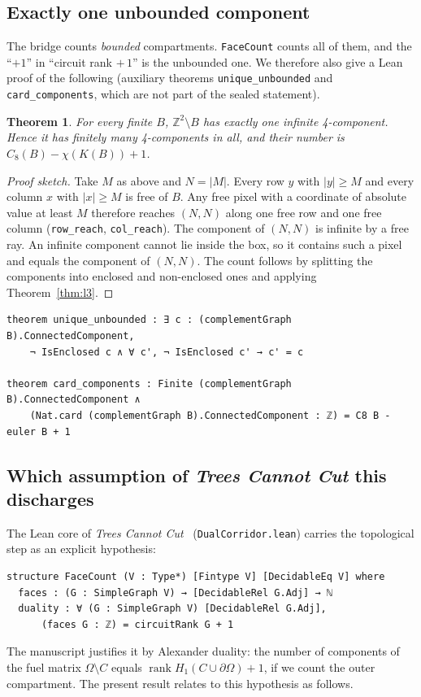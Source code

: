 \documentclass[11pt]{article}
\newtheorem{theorem}{Theorem}
\theoremstyle{definition}
\theoremstyle{remark}
\begin{document}
\subsection{Exactly one unbounded component}

The bridge counts \emph{bounded} compartments. \texttt{FaceCount} counts all of them,
and the ``$+1$'' in ``circuit rank $+\,1$'' is the unbounded one. We therefore also give a Lean
proof of the following (auxiliary theorems \texttt{unique\_unbounded} and
\texttt{card\_components}, which are not part of the sealed statement).

\begin{theorem}\label{thm:total}
For every finite $B$, $\mathbb{Z}^2\setminus B$ has exactly one infinite 4-component.
Hence it has finitely many 4-components in all, and their number is
$C_8(B)-\chi(K(B))+1$.
\end{theorem}

\begin{proof}[Proof sketch]
Take $M$ as above and $N=|M|$. Every row $y$ with $|y|\ge M$ and every column $x$ with
$|x|\ge M$ is free of $B$. Any free pixel with a coordinate of absolute value
at least $M$ therefore reaches $(N,N)$ along one free row and one free column
(\texttt{row\_reach}, \texttt{col\_reach}). The component of $(N,N)$ is infinite by a free ray.
An infinite component cannot lie inside the box, so it contains such a pixel and equals
the component of $(N,N)$. The count follows by splitting the components into enclosed and
non-enclosed ones and applying Theorem~\ref{thm:l3}.
\end{proof}

\begin{lstlisting}[caption={The total compartment count (excerpt from \texttt{proofs/P1.Bridge.lean}).}]
theorem unique_unbounded : ∃ c : (complementGraph B).ConnectedComponent,
    ¬ IsEnclosed c ∧ ∀ c', ¬ IsEnclosed c' → c' = c

theorem card_components : Finite (complementGraph B).ConnectedComponent ∧
    (Nat.card (complementGraph B).ConnectedComponent : ℤ) = C8 B - euler B + 1
\end{lstlisting}

\subsection{Which assumption of \emph{Trees Cannot Cut} this discharges}

The Lean core of \emph{Trees Cannot Cut}~\cite{Hart2026} (\texttt{DualCorridor.lean}) carries
the topological step as an explicit hypothesis:
\begin{lstlisting}
structure FaceCount (V : Type*) [Fintype V] [DecidableEq V] where
  faces : (G : SimpleGraph V) → [DecidableRel G.Adj] → ℕ
  duality : ∀ (G : SimpleGraph V) [DecidableRel G.Adj],
      (faces G : ℤ) = circuitRank G + 1
\end{lstlisting}
The manuscript justifies it by Alexander duality: the number of components of the fuel
matrix $\Omega\setminus C$ equals $\operatorname{rank}H_1(C\cup\partial\Omega)+1$, if we count the outer
compartment. The present result relates to this hypothesis as follows.
\end{document}

